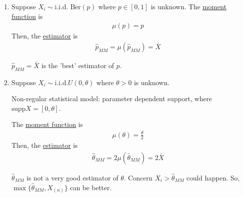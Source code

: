 \documentclass[11pt]{elegantbook}
\begin{document}
\begin{example}\quad
    \begin{enumerate}
        \item Suppose $X_i\sim \text{i.i.d. Ber}(p)$ where $p\in[0,1]$ is unknown. The \underline{moment function} is
        \begin{equation}
            \begin{aligned}
                \mu(p)=p
            \end{aligned}
            \nonumber
        \end{equation}
        Then, the \underline{estimator} is
        \begin{equation}
            \begin{aligned}
                \hat{p}_{MM}=\mu(\hat{p}_{MM})=\bar{X}
            \end{aligned}
            \nonumber
        \end{equation}
        \begin{remark}
            $\hat{p}_{MM}=\bar{X}$ is the 'best' estimator of $p$.
        \end{remark}
        \item Suppose $X_i\sim \text{i.i.d.}U(0,\theta)$ where $\theta>0$ is unknown.\\
        \begin{remark}
            Non-regular statistical model: parameter dependent support, where $\text{supp}X=[0,\theta]$.
        \end{remark}
        The \underline{moment function} is
        \begin{equation}
            \begin{aligned}
                \mu(\theta)=\frac{\theta}{2}
            \end{aligned}
            \nonumber
        \end{equation}
        Then, the \underline{estimator} is
        \begin{equation}
            \begin{aligned}
                \hat{\theta}_{MM}=2\mu(\hat{\theta}_{MM})=2\bar{X}
            \end{aligned}
            \nonumber
        \end{equation}
        \begin{remark}
            $\hat{\theta}_{MM}$ is not a very good estimator of $\theta$. Concern $X_i>\hat{\theta}_{MM}$ could happen. So, $\max\{\hat{\theta}_{MM},X_{(n)}\}$ can be better.
        \end{remark}
    \end{enumerate}
\end{example}
\end{document}
